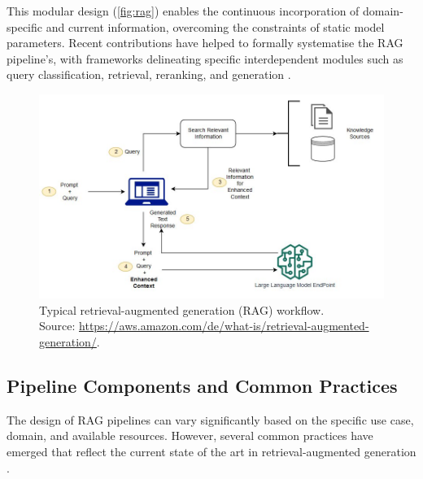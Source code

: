 \begin{spacing}{1.5}
This modular design (\autoref{fig:rag}) enables the continuous incorporation of domain-specific and current information, overcoming the constraints of static model parameters. Recent contributions have helped to formally systematise the RAG pipeline's, with frameworks delineating specific interdependent modules such as query classification, retrieval, reranking, and generation \parencite{wang_searching_2024,gao_retrieval-augmented_2024}.

\begin{figure}[H]
  \centering
  \includegraphics[width=\textwidth]{images/rag_workflow.jpg} 
  \caption{Typical retrieval-augmented generation (RAG) workflow.\\
  \footnotesize{Source: \url{https://aws.amazon.com/de/what-is/retrieval-augmented-generation/}.\nocite{noauthor_was_nodate}}}
  \label{fig:rag}
\end{figure}

\subsection{Pipeline Components and Common Practices}
The design of RAG pipelines can vary significantly based on the specific use case, domain, and available resources. However, several common practices have emerged that reflect the current state of the art in retrieval-augmented generation \citep{vaibhav_retrieval-augmented_2025,wang_searching_2024,arslan_survey_2024,gao_retrieval-augmented_2024,gupta_comprehensive_2024}.


\end{spacing}
